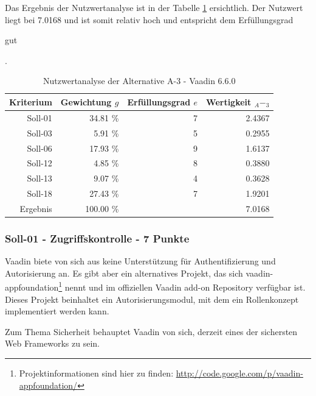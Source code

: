   Das Ergebnis der Nutzwertanalyse ist in der Tabelle \ref{tab:nwaA3}
  ersichtlich. Der Nutzwert liegt bei 7.0168 und ist somit relativ hoch und
  entspricht dem Erfüllungsgrad \begin{itshape}gut\end{itshape}.
    
  \begin{table}[ht]
    \sffamily 
    \begin{center}
      \begin{tabular}{r|rrr}
        \toprule
        \textbf{Kriterium} & \textbf{Gewichtung \(g\)} & \textbf{Erfüllungsgrad
        \(e\)} & \textbf{Wertigkeit \(_A-_3\)} \\
        \midrule
        Soll-01   & 34.81 \% & 7 & 2.4367 \\
        Soll-03   &  5.91 \% & 5 & 0.2955 \\
        Soll-06   & 17.93 \% & 9 & 1.6137 \\
        Soll-12   &  4.85 \% & 8 & 0.3880 \\
        Soll-13   &  9.07 \% & 4 & 0.3628 \\
        Soll-18   & 27.43 \% & 7 & 1.9201 \\
        \midrule
        \midrule
        Ergebnis  & 100.00 \% &   & 7.0168 \\
        \bottomrule
      \end{tabular}
      \caption{Nutzwertanalyse der Alternative A-3 - Vaadin 6.6.0}
      \label{tab:nwaA3}
    \end{center}
  \end{table}
  
  \subsubsection{Soll-01 - Zugriffskontrolle - 7 Punkte}
  
  Vaadin biete von sich aus keine Unterstützung für Authentifizierung und
  Autorisierung an. Es gibt aber ein alternatives Projekt, das sich
  vaadin-appfoundation\footnote{Projektinformationen sind hier zu finden:
  \url{http://code.google.com/p/vaadin-appfoundation/}} nennt und im
  offiziellen Vaadin add-on Repository verfügbar ist. Dieses Projekt beinhaltet
  ein Autorisierungsmodul, mit dem ein Rollenkonzept implementiert werden kann.
  
  Zum Thema Sicherheit behauptet Vaadin von sich, derzeit eines der sichersten
  Web Frameworks zu sein.
  
